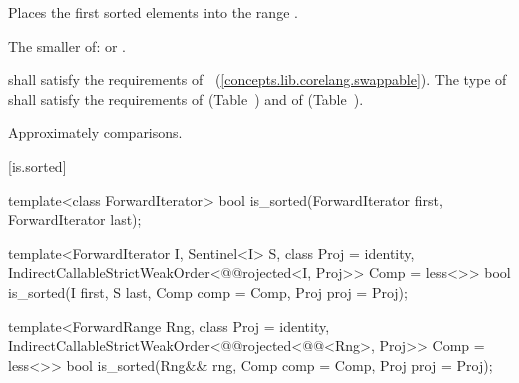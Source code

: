 \begin{itemdescr}
\pnum
\effects
Places the first
sorted elements into the range
.

\pnum
\returns
The smaller of:
 or
.

\begin{removedblock}
\pnum
\requires
{} shall satisfy the requirements of
~(\ref{concepts.lib.corelang.swappable}). The type
of  shall satisfy the requirements of
 (Table~) and of
 (Table~).
\end{removedblock}

\pnum
\complexity
Approximately
comparisons.
\end{itemdescr}

[is.sorted]{}

%
\begin{removedblock}
\begin{itemdecl}
template<class ForwardIterator>
  bool is_sorted(ForwardIterator first, ForwardIterator last);
\end{itemdecl}
\end{removedblock}
\begin{addedblock}
\begin{itemdecl}
template<ForwardIterator I, Sentinel<I> S, class Proj = identity,
    IndirectCallableStrictWeakOrder<@@rojected<I, Proj>> Comp = less<>>
  bool is_sorted(I first, S last, Comp comp = Comp{}, Proj proj = Proj{});

template<ForwardRange Rng, class Proj = identity,
    IndirectCallableStrictWeakOrder<@@rojected<@@<Rng>, Proj>> Comp = less<>>
  bool
    is_sorted(Rng&& rng, Comp comp = Comp{}, Proj proj = Proj{});
\end{itemdecl}
\end{addedblock}

\begin{itemdescr}
\pnum
\returns {}
\end{itemdescr}

